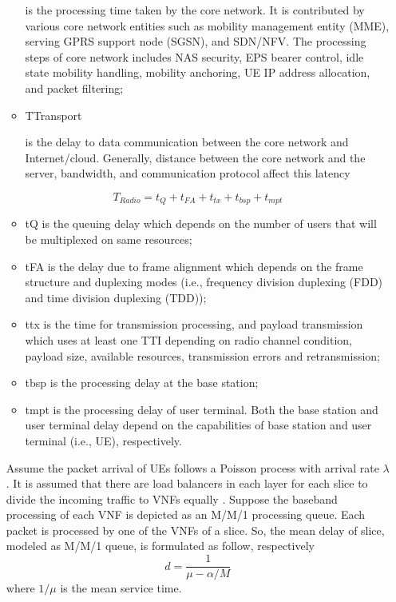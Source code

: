 \documentclass[conference]{IEEEtran}
\begin{document}
\begin{enumerate}
\begin{itemize}
 is the processing time taken by the core network.
It is contributed by various core network entities such
as mobility management entity (MME), serving GPRS
support node (SGSN), and SDN/NFV. The processing
steps of core network includes NAS security, EPS bearer
control, idle state mobility handling, mobility anchoring,
UE IP address allocation, and packet filtering;
\item TTransport

 is the delay to data communication between
the core network and Internet/cloud. Generally, distance
between the core network and the server, bandwidth, and
communication protocol affect this latency
\end{itemize}
\begin{equation}
T_{Radio} = t_{Q} + t_{FA} + t_{tx} + t_{bsp} + t_{mpt}
\end{equation}
\begin{itemize}
\item tQ is the queuing delay which depends on the number of
users that will be multiplexed on same resources;
\item tFA is the delay due to frame alignment which depends on
the frame structure and duplexing modes (i.e., frequency
division duplexing (FDD) and time division duplexing
(TDD));
\item ttx is the time for transmission processing, and payload
transmission which uses at least one TTI depending on
radio channel condition, payload size, available resources,
transmission errors and retransmission;
\item tbsp is the processing delay at the base station;
\item  tmpt is the processing delay of user terminal. Both
the base station and user terminal delay depend on the
capabilities of base station and user terminal (i.e., UE),
respectively.
\end{itemize}
Assume the packet arrival of UEs follows a Poisson process with arrival rate $\lambda$.
It is assumed that there are load balancers in each layer for each slice to divide the incoming traffic to VNFs equally \cite{frdl,luong2018novel,luong2018novel1}.
Suppose the baseband processing of each VNF is depicted as an M/M/1 processing queue.
Each packet is processed by one of the VNFs of a slice. So, the mean delay of  slice, modeled as M/M/1 queue, is formulated as follow, respectively
\begin{equation}
d = \frac{1}{\mu - \alpha/{M}}
\end{equation}
where $1/\mu$ is the mean service time.

\end{enumerate}
\end{document}
